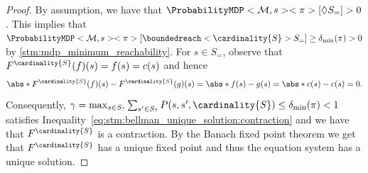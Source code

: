 \documentclass{article}
\newcommand{\MDP}{\mathcal{M}}
\newcommand{\States}{S}
\newcommand{\strategy}{\pi}
\newcommand{\reach}{\Diamond}
\begin{document}
\begin{proof}
	By assumption, we have that $\ProbabilityMDP<\MDP, s><\strategy>[\reach \States_=] > 0$.
	This implies that $\ProbabilityMDP<\MDP, s><\strategy>[\boundedreach<\cardinality{\States}> \States_=] \geq \delta_{\min}(\strategy) > 0$ by \cref{stm:mdp_minimum_reachability}.
	For $s \in S_=$, observe that $F^{\cardinality{S}}(f)(s) = f(s) = c(s)$ and hence
	\begin{equation*}
		\abs*{F^{\cardinality{\States}}(f)(s) - F^{\cardinality{\States}}(g)(s)} = \abs*{f(s) - g(s)} = \abs*{c(s) - c(s)} = 0.
	\end{equation*}
	Consequently, $\gamma = \max_{s \in \States_?} \sum_{s' \in \States_?} P(s, s', \cardinality{S}) \leq \delta_{\min}(\strategy) < 1$ satisfies Inequality~\eqref{eq:stm:bellman_unique_solution:contraction} and we have that $F^{\cardinality{\States}}$ is a contraction.
	By the Banach fixed point theorem we get that $F^{\cardinality{\States}}$ has a unique fixed point and thus the equation system has a unique solution. 
\end{proof}
\end{document}
